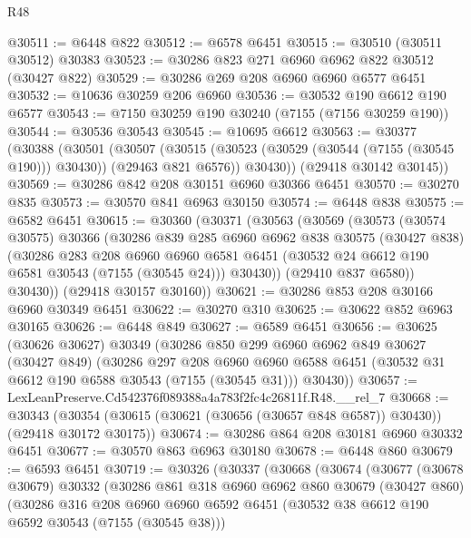 \begin{lexlean}{R48}
\begin{coremodule}
@30511 := @6448 @822
@30512 := @6578 @6451
@30515 := @30510 (@30511 @30512) @30383
@30523 := @30286 @823 @271 @6960 @6962 @822 @30512 (@30427 @822)
@30529 := @30286 @269 @208 @6960 @6960 @6577 @6451
@30532 := @10636 @30259 @206 @6960
@30536 := @30532 @190 @6612 @190 @6577
@30543 := @7150 @30259 @190 @30240 (@7155 (@7156 @30259 @190))
@30544 := @30536 @30543
@30545 := @10695 @6612
@30563 := @30377
    (@30388
      (@30501
        (@30507
          (@30515 (@30523 (@30529 (@30544 (@7155 (@30545 @190))) @30430)) (@29463 @821 @6576))
          @30430))
      (@29418 @30142 @30145))
@30569 := @30286 @842 @208 @30151 @6960 @30366 @6451
@30570 := @30270 @835
@30573 := @30570 @841 @6963 @30150
@30574 := @6448 @838
@30575 := @6582 @6451
@30615 := @30360
    (@30371
      (@30563
        (@30569
          (@30573
            (@30574 @30575)
            @30366
            (@30286
              @839
              @285
              @6960
              @6962
              @838
              @30575
              (@30427 @838)
              (@30286
                @283
                @208
                @6960
                @6960
                @6581
                @6451
                (@30532 @24 @6612 @190 @6581 @30543 (@7155 (@30545 @24)))
                @30430))
            (@29410 @837 @6580))
          @30430))
      (@29418 @30157 @30160))
@30621 := @30286 @853 @208 @30166 @6960 @30349 @6451
@30622 := @30270 @310
@30625 := @30622 @852 @6963 @30165
@30626 := @6448 @849
@30627 := @6589 @6451
@30656 := @30625
    (@30626 @30627)
    @30349
    (@30286
      @850
      @299
      @6960
      @6962
      @849
      @30627
      (@30427 @849)
      (@30286
        @297
        @208
        @6960
        @6960
        @6588
        @6451
        (@30532 @31 @6612 @190 @6588 @30543 (@7155 (@30545 @31)))
        @30430))
@30657 := LexLeanPreserve.Cd542376f089388a4a783f2fc4c26811f.R48.__rel_7
@30668 := @30343
    (@30354 (@30615 (@30621 (@30656 (@30657 @848 @6587)) @30430)) (@29418 @30172 @30175))
@30674 := @30286 @864 @208 @30181 @6960 @30332 @6451
@30677 := @30570 @863 @6963 @30180
@30678 := @6448 @860
@30679 := @6593 @6451
@30719 := @30326
    (@30337
      (@30668
        (@30674
          (@30677
            (@30678 @30679)
            @30332
            (@30286
              @861
              @318
              @6960
              @6962
              @860
              @30679
              (@30427 @860)
              (@30286
                @316
                @208
                @6960
                @6960
                @6592
                @6451
                (@30532 @38 @6612 @190 @6592 @30543 (@7155 (@30545 @38)))

\end{coremodule}
\end{lexlean}
